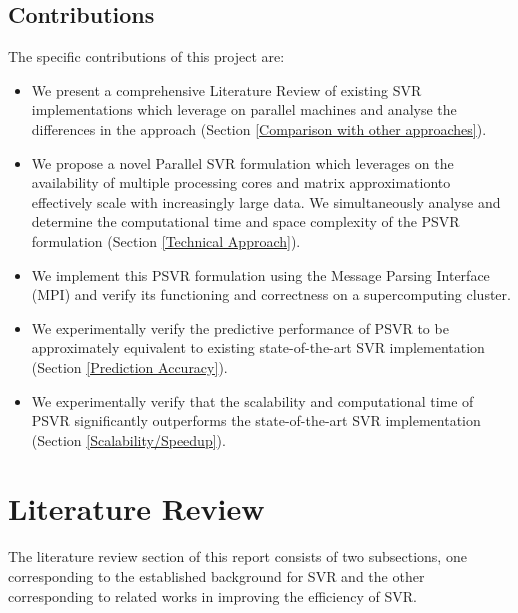 \documentclass[12pt]{article}
\begin{document}
\subsection{Contributions}
The specific contributions of this project are:
\begin{itemize}
\item We present a comprehensive Literature Review of existing SVR implementations which leverage on parallel machines and analyse the differences in the approach (Section \ref{Comparison with other approaches}).
\item We propose a novel Parallel SVR formulation which leverages on the availability of multiple processing cores and matrix approximation\footnotemark to effectively scale with increasingly large data. We simultaneously analyse and determine the computational time and space complexity of the PSVR formulation (Section \ref{Technical Approach}).
\item We implement this PSVR formulation using the Message Parsing Interface (MPI) and verify its functioning and correctness on a supercomputing cluster.
\item We experimentally verify the predictive performance of PSVR to be approximately equivalent to existing state-of-the-art SVR implementation (Section \ref{Prediction Accuracy}).
\item We experimentally verify that the scalability and computational time of PSVR significantly outperforms the state-of-the-art SVR implementation (Section \ref{Scalability/Speedup}).
\end{itemize}

\cleardoublepage
\section{Literature Review}
The literature review section of this report consists of two subsections, one corresponding to the established background for SVR and the other corresponding to related works in improving the efficiency of SVR.
\end{document}
